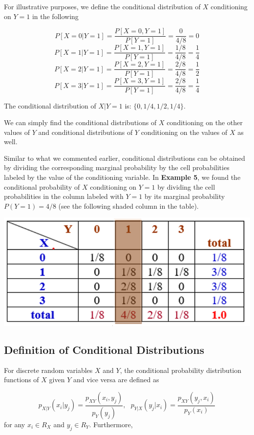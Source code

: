 \documentclass[
]{book}
\begin{document}
For illustrative purposes, we define the conditional distribution of \(X\) conditioning on \(Y=1\) in the following

\[
P[X=0|Y=1] = \frac{P[X=0, Y=1]}{P[Y=1]} = \frac{0}{4/8} = 0
\]
\[
P[X=1|Y=1] = \frac{P[X=1, Y=1]}{P[Y=1]} = \frac{1/8}{4/8} = \frac{1}{4}
\]
\[
P[X=2|Y=1] = \frac{P[X=2, Y=1]}{P[Y=1]} = \frac{2/8}{4/8} = \frac{1}{2}
\]
\[
P[X=3|Y=1] = \frac{P[X=3, Y=1]}{P[Y=1]} = \frac{2/8}{4/8} = \frac{1}{4}
\]

The conditional distribution of \(X|Y=1\) is: \(\{0, 1/4, 1/2, 1/4\}\).

We can simply find the conditional distributions of \(X\) conditioning on the other values of \(Y\) and conditional distributions of \(Y\) conditioning on the values of \(X\) as well.

Similar to what we commented earlier, conditional distributions can be obtained by dividing the corresponding marginal probability by the cell probabilities labeled by the value of the conditioning variable. In \textbf{Example 5}, we found the conditional probability of \(X\) conditioning on \(Y=1\) by dividing the cell probabilities in the column labeled with \(Y=1\) by its marginal probability \(P(Y=1) = 4/8\) (see the following shaded column in the table).

\begin{center}\includegraphics[width=0.45\linewidth]{topic07/example05DiscreteConditionalProb} \end{center}

\hypertarget{definition-of-conditional-distributions}{%
\subsection{Definition of Conditional Distributions}\label{definition-of-conditional-distributions}}

For discrete random variables \(X\) and \(Y\), the conditional probability distribution functions of \(X\) given \(Y\) and vice versa are defined as

\[
p_{X|Y}(x_i|y_j)=\frac{p_{XY}(x_i,y_j)}{p_Y(y_j)}, \ \ \  p_{Y|X}(y_j|x_i)=\frac{p_{XY}(y_j,x_i)}{p_Y(x_i)}
\]
for any \(x_i \in R_X\) and \(y_j\in R_Y\). Furthermore,
\end{document}

